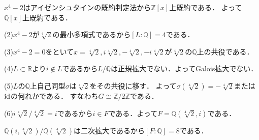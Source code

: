 \documentclass[
		book,
		head_space=20mm,
		foot_space=20mm,
		gutter=10mm,
		line_length=190mm
]{jlreq}
\begin{document}
$x^4-2$はアイゼンシュタインの既約判定法から$\mathbb{Z}[x]$上既約である．
よって$\mathbb{Q}[x]$上既約である．

(2)$x^4-2$が$\sqrt[4]{2}$の最小多項式であるから$[L:\mathbb{Q}]=4$である．

(3)$x^4-2=0$をといて$x=\sqrt[4]{2},i\sqrt[4]{2},-\sqrt[4]{2},-i\sqrt[4]{2}$が$\sqrt[4]{2}$の$\mathbb{Q}$上の共役である．

(4)$L\subset \mathbb{R}$より$i\notin L$であるから$L/\mathbb{Q}$は正規拡大でない．よってGalois拡大でない．

(5)$L$の$\mathbb{Q}$上自己同型$\sigma$は$\sqrt[4]{2}$をその共役に移す．
よって$\sigma(\sqrt[4]{2})=-\sqrt[4]{2}$または$\mathop{\mathrm{id}}$の何れかである．
すなわち$G\cong \mathbb{Z}/2\mathbb{Z}$である．

(6)$i\sqrt[4]{2}/\sqrt[4]{2}=i$であるから$i\in F$である．よって$F=\mathbb{Q}(\sqrt[4]{2},i)$である．

$\mathbb{Q}(i,\sqrt[4]{2})/\mathbb{Q}(\sqrt[4]{2})$は二次拡大であるから$[F:\mathbb{Q}]=8$である．
\end{document}
